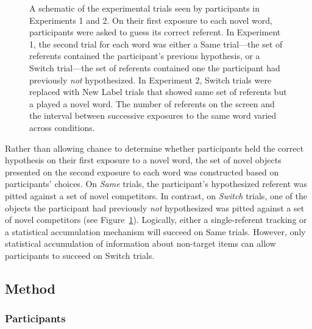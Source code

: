 \documentclass[man,floatsintext]{apa6}
\begin{document}
\begin{figure}[tb]
	\caption{\label{fig:design} A schematic of the experimental trials seen by participants in Experiments 1 and 2. On their first exposure to each novel word, participants were asked to guess its correct referent. In Experiment 1, the second trial for each word was either a Same trial---the set of referents contained the participant's previous hypothesis, or a Switch trial---the set of referents contained one the participant had previously \emph{not} hypothesized. In Experiment 2, Switch trials were replaced with New Label trials that showed same set of referents but a played a novel word. The number of referents on the screen and the interval between successive exposures to the same word varied across conditions.}
\end{figure}

Rather than allowing chance to determine whether participants held the correct hypothesis on their first exposure to a novel word, the set of novel objects presented on the second exposure to each word was constructed based on participants' choices. On \emph{Same} trials, the participant's hypothesized referent was pitted against a set of novel competitors. In contrast, on \emph{Switch} trials, one of the objects the participant had previously \emph{not} hypothesized was pitted against a set of novel competitors (see Figure~\ref{fig:design}). Logically, either a single-referent tracking or a statistical accumulation mechanism will succeed on Same trials. However, only statistical accumulation of information about non-target items can allow participants to succeed on Switch trials.

\subsection{Method}

\subsubsection{Participants}
\end{document}
